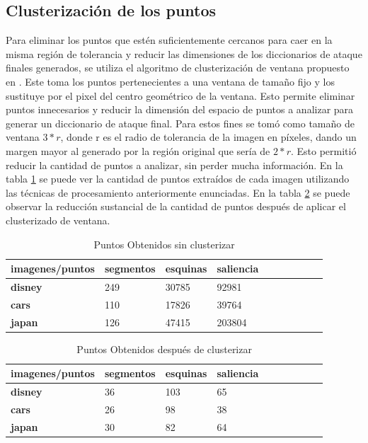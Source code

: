 \subsection{Clusterizaci\'on de los puntos }
Para eliminar los puntos que est\'en suficientemente cercanos para caer en la misma regi\'on de tolerancia y reducir las dimensiones de los diccionarios de ataque finales generados, se utiliza el algoritmo de clusterizaci\'on de ventana propuesto en \cite{van2010purely}. Este toma los puntos pertenecientes a una ventana de tama\~no fijo y los sustituye por el pixel del centro geom\'etrico de la ventana. Esto permite eliminar puntos innecesarios y reducir la dimensi\'on del espacio de puntos a analizar para generar un diccionario de ataque final. Para estos fines se tom\'o como tama\~no de ventana $3*r$, donde r es el radio de tolerancia de la imagen en p\'ixeles, dando un margen mayor al generado por la regi\'on original que ser\'ia de $2*r$. Esto permiti\'o reducir la cantidad de puntos a analizar, sin perder mucha informaci\'on. En la tabla \ref{points:void} se puede ver la cantidad de puntos extra\'idos de cada imagen utilizando las t\'ecnicas de procesamiento anteriormente enunciadas. En la tabla \ref{points:cluster} se puede observar la reducci\'on sustancial de la cantidad de puntos despu\'es de aplicar el clusterizado de ventana.
\begin{table}[H]
	\centering
	\caption{Puntos Obtenidos sin clusterizar}
	\label{points:void}
	\begin{tabular}{|l|l|l|l|l|l|l|l|l|l|}
		\hline
		\textbf{imagenes/puntos} & \textbf{segmentos } & \textbf{esquinas} & \textbf{saliencia}
		\\ \hline
		\textbf{disney} & 249 & 30785 & 92981 \\ \hline
		\textbf{cars} & 110 & 17826 & 39764 \\ \hline
		\textbf{japan} & 126 & 47415 & 203804  \\ \hline
	
	\end{tabular}
\end{table}

\begin{table}[H]
	\centering
	\caption{Puntos Obtenidos despu\'es de clusterizar}
		\label{points:cluster}
	\begin{tabular}{|l|l|l|l|l|l|l|l|l|l|}
		\hline
		\textbf{imagenes/puntos} & \textbf{segmentos} & \textbf{esquinas} & \textbf{saliencia }  \\ \hline
		\textbf{disney} & 36 & 103 & 65  \\ \hline
		\textbf{cars} & 26 & 98 & 38  \\ \hline
		\textbf{japan} & 30 & 82 & 64 \\ \hline
	\end{tabular}
\end{table}

